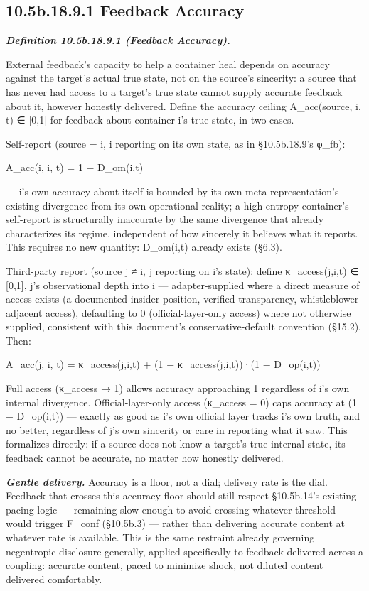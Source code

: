 \documentclass[
]{article}
\begin{document}
\hypertarget{b.18.9.1-feedback-accuracy}{%
\subsection{10.5b.18.9.1 Feedback
Accuracy}\label{b.18.9.1-feedback-accuracy}}

\emph{\textbf{Definition 10.5b.18.9.1 (Feedback Accuracy).}}

External feedback's capacity to help a container heal depends on
accuracy against the target's actual true state, not on the source's
sincerity: a source that has never had access to a target's true state
cannot supply accurate feedback about it, however honestly delivered.
Define the accuracy ceiling A\_acc(source, i, t) ∈ {[}0,1{]} for
feedback about container i's true state, in two cases.

Self-report (source = i, i reporting on its own state, as in
§10.5b.18.9's φ\_fb):

A\_acc(i, i, t) = 1 − D\_om(i,t)

--- i's own accuracy about itself is bounded by its own
meta-representation's existing divergence from its own operational
reality; a high-entropy container's self-report is structurally
inaccurate by the same divergence that already characterizes its regime,
independent of how sincerely it believes what it reports. This requires
no new quantity: D\_om(i,t) already exists (§6.3).

Third-party report (source j ≠ i, j reporting on i's state): define
κ\_access(j,i,t) ∈ {[}0,1{]}, j's observational depth into i ---
adapter-supplied where a direct measure of access exists (a documented
insider position, verified transparency, whistleblower-adjacent access),
defaulting to 0 (official-layer-only access) where not otherwise
supplied, consistent with this document's conservative-default
convention (§15.2). Then:

A\_acc(j, i, t) = κ\_access(j,i,t) + (1 − κ\_access(j,i,t))·(1 −
D\_op(i,t))

Full access (κ\_access → 1) allows accuracy approaching 1 regardless of
i's own internal divergence. Official-layer-only access (κ\_access = 0)
caps accuracy at (1 − D\_op(i,t)) --- exactly as good as i's own
official layer tracks i's own truth, and no better, regardless of j's
own sincerity or care in reporting what it saw. This formalizes
directly: if a source does not know a target's true internal state, its
feedback cannot be accurate, no matter how honestly delivered.

\emph{\textbf{Gentle delivery.}} Accuracy is a floor, not a dial;
delivery rate is the dial. Feedback that crosses this accuracy floor
should still respect §10.5b.14's existing pacing logic --- remaining
slow enough to avoid crossing whatever threshold would trigger F\_conf
(§10.5b.3) --- rather than delivering accurate content at whatever rate
is available. This is the same restraint already governing negentropic
disclosure generally, applied specifically to feedback delivered across
a coupling: accurate content, paced to minimize shock, not diluted
content delivered comfortably.
\end{document}
